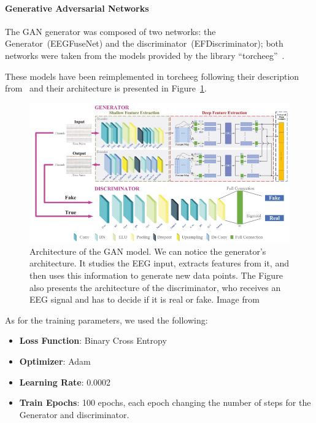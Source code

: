 \paragraph*{Generative Adversarial Networks}
The GAN generator was composed of two networks: the Generator~(EEGFuseNet) and the discriminator~(EFDiscriminator); both networks were taken from the models provided by the library ``torcheeg''~\cite{zhang2024torcheeg}.

These models have been reimplemented in torcheeg following their description from~\cite{liang2021eegfusenet} and their architecture is presented in Figure~\ref{fig:gan_paper}.
\begin{figure}[!htbp]
    \centering
    \includegraphics[width=\textwidth]{Figures/Methodology/GAN}
    \caption{Architecture of the GAN model. 
    We can notice the generator's architecture. It studies the EEG input, extracts features from it, and then uses this information to generate new data points. 
    The Figure also presents the architecture of the discriminator, who receives an EEG signal and has to decide if it is real or fake. Image from~\cite{liang2021eegfusenet}}\label{fig:gan_paper}
\end{figure}


As for the training parameters, we used the following:
\begin{itemize}
    \item \textbf{Loss Function}: Binary Cross Entropy
    \item \textbf{Optimizer}: Adam
    \item \textbf{Learning Rate}: 0.0002
    \item \textbf{Train Epochs}: 100 epochs, each epoch changing the number of steps for the Generator and discriminator.
\end{itemize}
